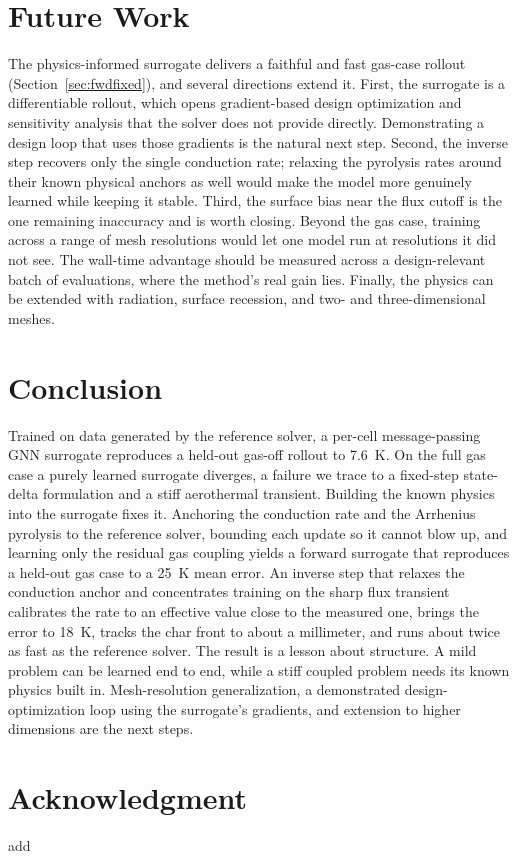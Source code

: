 \documentclass[conference]{IEEEtran}
\begin{document}
\section{Future Work}
The physics-informed surrogate delivers a faithful and fast gas-case rollout
(Section~\ref{sec:fwdfixed}), and several directions extend it. First, the surrogate
is a differentiable rollout, which opens gradient-based design optimization and
sensitivity analysis that the solver does not provide directly. Demonstrating a
design loop that uses those gradients is the natural next step. Second, the inverse
step recovers only the single conduction rate; relaxing the pyrolysis rates around
their known physical anchors as well would make the model more genuinely learned
while keeping it stable. Third, the surface bias near the flux cutoff is the
one remaining inaccuracy and is worth closing. Beyond the gas case, training across a
range of mesh resolutions would let one model run at resolutions it did not see. The
wall-time advantage should be measured across a design-relevant batch of
evaluations, where the method's real gain lies. Finally, the physics can be extended
with radiation, surface recession, and two- and three-dimensional meshes.

\section{Conclusion}
Trained on data generated by the reference solver, a per-cell
message-passing GNN surrogate reproduces a held-out gas-off rollout to 7.6~K.
On the full gas case a purely learned surrogate diverges, a failure we trace to a
fixed-step state-delta formulation and a stiff aerothermal transient. Building the
known physics into the surrogate fixes it. Anchoring the conduction rate and the
Arrhenius pyrolysis to the reference solver, bounding each update so it cannot blow
up, and learning only the residual gas coupling yields a forward surrogate that
reproduces a held-out gas case to a 25~K mean error. An inverse step that relaxes the
conduction anchor and concentrates training on the sharp flux transient calibrates
the rate to an effective value close to the measured one, brings the error to 18~K,
tracks the char front to about a millimeter, and runs about twice as fast as the
reference solver. The result is a lesson about
structure. A mild problem can be learned end to end, while a stiff coupled problem
needs its known physics built in. Mesh-resolution generalization, a demonstrated
design-optimization loop using the surrogate's gradients, and extension to higher
dimensions are the next steps.

\section*{Acknowledgment}
add



\end{document}
